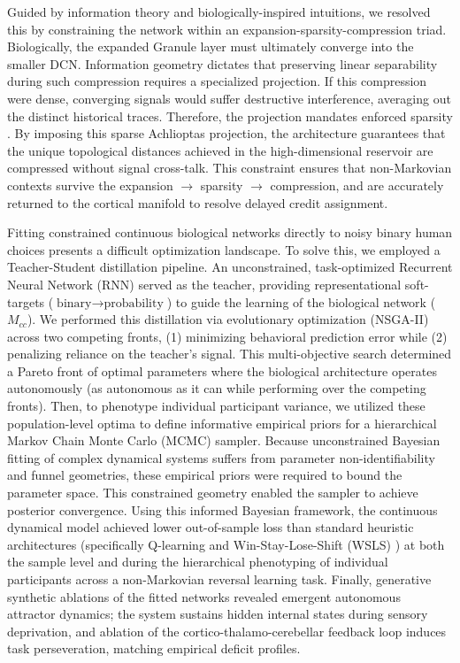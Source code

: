 \documentclass[12pt, a4paper]{extarticle}
\begin{document}
	Guided by information theory and biologically-inspired intuitions, we resolved this by constraining the network within an expansion-sparsity-compression triad. Biologically, the expanded Granule layer must ultimately converge into the smaller DCN. Information geometry dictates that preserving linear separability during such compression requires a specialized projection. If this compression were dense, converging signals would suffer destructive interference, averaging out the distinct historical traces. Therefore, the projection mandates enforced sparsity \parencite{achlioptasDatabasefriendlyRandomProjections2003}. By imposing this sparse Achlioptas projection, the architecture guarantees that the unique topological distances achieved in the high-dimensional reservoir are compressed without signal cross-talk. This constraint ensures that non-Markovian contexts survive the expansion $\rightarrow$ sparsity $\rightarrow$ compression, and are accurately returned to the cortical manifold to resolve delayed credit assignment.
	
	Fitting constrained continuous biological networks directly to noisy binary human choices presents a difficult optimization landscape. To solve this, we employed a Teacher-Student distillation pipeline. An unconstrained, task-optimized Recurrent Neural Network (RNN) served as the teacher, providing representational soft-targets ($\text{binary} \rightarrow \text{probability}$) to guide the learning of the biological network ($M_{cc}$). We performed this distillation via evolutionary optimization (NSGA-II) across two competing fronts, (1) minimizing behavioral prediction error while (2) penalizing reliance on the teacher's signal. This multi-objective search determined a Pareto front of optimal parameters where the biological architecture operates autonomously (as autonomous as it can while performing over the competing fronts). Then, to phenotype individual participant variance, we utilized these population-level optima to define informative empirical priors for a hierarchical Markov Chain Monte Carlo (MCMC) sampler. Because unconstrained Bayesian fitting of complex dynamical systems suffers from parameter non-identifiability and funnel geometries, these empirical priors were required to bound the parameter space. This constrained geometry enabled the sampler to achieve posterior convergence. Using this informed Bayesian framework, the continuous dynamical model achieved lower out-of-sample loss than standard heuristic architectures (specifically Q-learning \parencite{watkinsQlearning1992} and Win-Stay-Lose-Shift (WSLS) \parencite{nowakWinStayLoseShiftStrategy1993}) at both the sample level and during the hierarchical phenotyping of individual participants across a non-Markovian reversal learning task. Finally, generative synthetic ablations of the fitted networks revealed emergent autonomous attractor dynamics; the system sustains hidden internal states during sensory deprivation, and ablation of the cortico-thalamo-cerebellar feedback loop induces task perseveration, matching empirical deficit profiles.
	
\end{document}
